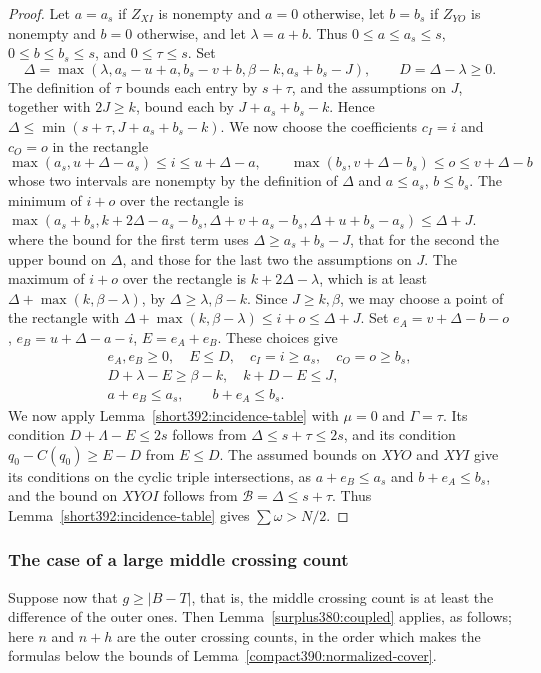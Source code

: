 \begin{proof}
Let $a=a_s$ if $Z_{XI}$ is nonempty and $a=0$ otherwise, let $b=b_s$ if $Z_{YO}$ is nonempty and $b=0$ otherwise,
and let $\lambda=a+b$. Thus $0\le a\le a_s\le s$,
$0\le b\le b_s\le s$, and $0\le\tau\le s$.
Set
\[
 \Delta=\max(\lambda,a_s-u+a,b_s-v+b,\beta-k,a_s+b_s-J),
 \qquad D=\Delta-\lambda\ge0.
\]
The definition of $\tau$ bounds each entry by $s+\tau$, and
the assumptions on $J$, together with $2J\ge k$,
bound each by $J+a_s+b_s-k$. Hence $\Delta\le\min(s+\tau,J+a_s+b_s-k)$. We now choose the coefficients $c_I=i$ and $c_O=o$ in the rectangle
\[
 \max(a_s,u+\Delta-a_s)\le i\le u+\Delta-a,\qquad
 \max(b_s,v+\Delta-b_s)\le o\le v+\Delta-b
\]
whose two intervals are nonempty by the definition of $\Delta$ and
$a\le a_s$, $b\le b_s$. The minimum of $i+o$ over the rectangle is $\max(a_s+b_s,k+2\Delta-a_s-b_s, \Delta+v+a_s-b_s,\Delta+u+b_s-a_s)\le\Delta+J$. where the bound for the first term uses $\Delta\ge a_s+b_s-J$, that for the second the upper bound on $\Delta$, and those for the last two the assumptions on $J$.
The maximum of $i+o$ over the rectangle is $k+2\Delta-\lambda$, which is at least
$\Delta+\max(k,\beta-\lambda)$, by
$\Delta\ge\lambda,\beta-k$. Since $J\ge k,\beta$,
we may choose a point of the rectangle with $\Delta+\max(k,\beta-\lambda)\le i+o\le\Delta+J$. Set $e_A=v+\Delta-b-o$, $e_B=u+\Delta-a-i$, $E=e_A+e_B$.
These choices give
\[
\begin{gathered}
 e_A,e_B\ge0,\quad E\le D,\quad c_I=i\ge a_s,\quad c_O=o\ge b_s,\\
 D+\lambda-E\ge\beta-k,\quad k+D-E\le J,\\
                  a+e_B\le a_s,\qquad b+e_A\le b_s.
\end{gathered}
\]
We now apply Lemma~\ref{short392:incidence-table} with $\mu=0$ and
$\Gamma=\tau$. Its condition $D+\Lambda-E\le2s$ follows from
$\Delta\le s+\tau\le2s$, and its condition $q_0-C(q_0)\ge E-D$ from
$E\le D$. The assumed bounds on $XYO$ and $XYI$ give its conditions on the cyclic triple intersections, as $a+e_B\le a_s$ and $b+e_A\le b_s$, and the bound on $XYOI$ follows from
$\mathcal B=\Delta\le s+\tau$. Thus Lemma~\ref{short392:incidence-table} gives $\sum\omega>N/2$.
\end{proof}
\subsubsection{The case of a large middle crossing count}
Suppose now that $g\ge|B-T|$, that is, the middle crossing count is at least the difference of the outer ones. Then Lemma~\ref{surplus380:coupled} applies, as follows; here $n$ and $n+h$ are the outer crossing counts, in the order which makes the formulas below the bounds of Lemma~\ref{compact390:normalized-cover}.

